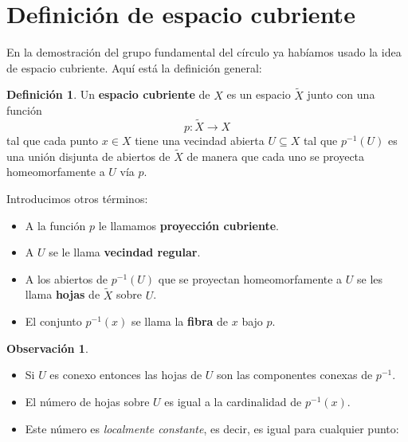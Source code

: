 \documentclass[spanish]{book}
\theoremstyle{definition}
\newtheorem*{defn}{Definición}
\newtheorem*{obs}{Observación}
\begin{document}
\section{Definición de espacio cubriente}
En la demostración del grupo fundamental del círculo ya habíamos usado la idea de espacio cubriente. Aquí está la definición general:
\begin{defn}
	Un \textbf{espacio cubriente} de $X$ es un espacio $\tilde X$ junto con una función \[p:\tilde X\to X\] tal que cada punto $x\in X$ tiene una vecindad abierta $U\subseteq X$ tal que $p^{-1}(U)$ es una unión disjunta de abiertos de $\tilde X$ de manera que cada uno se proyecta homeomorfamente a $U$ vía $p$.
\end{defn}
\begin{figure}
\vspace{-2.6cm}
\end{figure}
	Introducimos otros términos:
	\begin{itemize}
		\item A la función $p$ le llamamos \textbf{proyección cubriente}.
		\item A $U$ se le llama \textbf{vecindad regular}.
		\item A los abiertos de $p^{-1}(U)$ que se proyectan homeomorfamente a $U$ se les llama \textbf{hojas} de $\tilde X$ sobre $U$.
		\item El conjunto $p^{-1}(x)$ se llama la \textbf{fibra} de $x$ bajo $p$.
	\end{itemize}
	\begin{obs}\leavevmode
		\begin{itemize}
			\item Si $U$ es conexo entonces las hojas de $U$ son las componentes conexas de $p^{-1}$.
			\item El número de hojas sobre $U$ es igual a la cardinalidad de $p^{-1}(x)$.
			\item Este número es \textit{localmente constante}, es decir, es igual para cualquier punto:
		\end{itemize}
	\end{obs}\newpage
	
\end{document}
